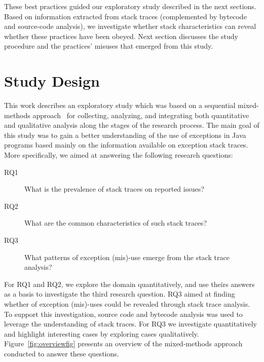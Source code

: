 \documentclass[conference]{IEEEtran}
\begin{document}
These best practices guided our exploratory study described in the next
sections. Based on information extracted from stack traces (complemented by
bytecode and source-code analysis), we investigate whether stack characteristics
can reveal whether these practices have been obeyed. Next section discusses the
study procedure and the practices' misuses that emerged from this study.

\section{Study Design}

This work describes an exploratory study which was based on a sequential
mixed-methods approach~\cite{ivankova2006using} for collecting, analyzing, and
integrating both quantitative and qualitative analysis along the stages of the
research process. The main goal of this study was to gain a better understanding
of the use of exceptions in Java programs based mainly on the information
available on exception stack traces. More specifically, we aimed at answering
the following research questions:

\begin{description}

  \item[RQ1] What is the prevalence of stack traces on  reported issues?

  \item[RQ2] What are the common characteristics of such stack traces?

  \item[RQ3] What patterns of exception (mis)-use emerge from the stack trace
    analysis?

\end{description}

For RQ1 and RQ2, we explore the domain quantitatively, and use theirs answers as
a basis to investigate the third research question. RQ3 aimed at finding whether
of exception (mis)-uses could be revealed through stack trace analysis. To
support this investigation, source code and bytecode analysis was used to
leverage the  understanding of stack traces. For RQ3 we investigate
quantitatively and highlight interesting cases by exploring cases qualitatively.
Figure~\ref{fig:overviewfig} presents an overview of the mixed-methods approach
conducted to answer these questions.
\end{document}
